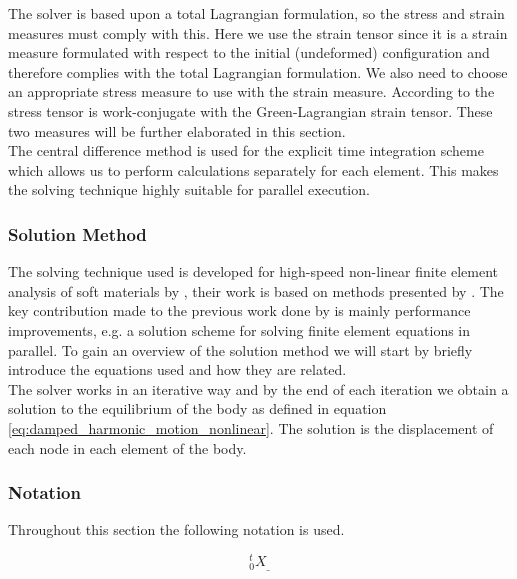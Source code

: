 The solver is based upon a total Lagrangian formulation, so the stress
and strain measures must comply with this. Here we use the
 strain tensor since it is a strain
measure formulated with respect to the initial (undeformed)
configuration and therefore complies with the total Lagrangian formulation.
We also need to choose an appropriate stress
measure to use with the strain measure. According to
 the  stress tensor
is work-conjugate with the Green-Lagrangian strain
tensor. These two measures will be further elaborated in
this section. \\

The central difference method is used for the explicit time
integration scheme which allows us to perform calculations
separately for each element. This makes the 
solving technique highly suitable for parallel execution. 

\subsubsection{Solution Method}
The solving technique used is developed for high-speed non-linear finite
element analysis of soft materials by , their work
is based on methods 
presented by . The key contribution made to the
previous work done by  is mainly performance
improvements, e.g. a solution scheme for
solving finite element equations in parallel. To gain an overview of
the solution method we will start by briefly introduce the
equations used and how they are related. \\

The solver works in an iterative way and
by the end of each iteration we obtain a solution to the equilibrium
of the body as defined in equation
\eqref{eq:damped_harmonic_motion_nonlinear}. The solution 
is the displacement of each node in each element of the body. \\

\subsubsection*{Notation}
Throughout this section the following notation is used.

\begin{equation}
\label{eq:notation}
^t_0X_{\_}
\end{equation}

